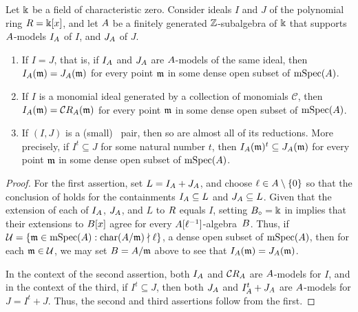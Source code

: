 \documentclass{amsart}
\begin{document}
\begin{corollary}
\label{reduction basics: C}
Let $\Bbbk$ be a field of characteristic zero.  Consider ideals  $I$ and $J$ of the polynomial ring $R = \Bbbk[x]$, and let $A$ be a finitely generated $\mathbb{Z}$-subalgebra of $\Bbbk$ that supports $A$-models $I_A$ of $I$, and $J_A$ of $J$.   

\begin{enumerate}[$(1)$]
\item \label{different models of same ideal}
If $I=J$, that is, if $I_A$ and $J_A$ are $A$-models of the same ideal, then $I_A(\mathfrak{m}) = J_A(\mathfrak{m})$ for every point $\mathfrak{m}$ in some dense open subset of $\operatorname{mSpec}(A)$.
\item \label{reduction preserves being monomial} If $I$ is a monomial ideal generated by a collection of monomials $\mathcal{C}$, then $I_A(\mathfrak{m}) = \mathcal{C} R_A(\mathfrak{m})$ for every point $\mathfrak{m}$ in some dense open subset of $\operatorname{mSpec}(A)$.
\item \label{reduction preserves compatibility} If $(I,J)$ is a \textup(small\textup) \compatible\ pair, then so are almost all of its reductions.  More precisely, if $I^t \subseteq J$ for some natural number $t$, then $I_A(\mathfrak{m})^t \subseteq J_A(\mathfrak{m})$ for every point $\mathfrak{m}$ in some dense open subset of $\operatorname{mSpec}(A)$.
\end{enumerate}
\end{corollary}

\begin{proof}
   For the first assertion, set $L=I_A + J_A$, and choose $\ell \in A \setminus \{0\}$ so that the conclusion of  holds for the containments $I_A \subseteq L$ and $J_A \subseteq L$.
   Given that the extension of each of $I_A$, $J_A$, and $L$ to $R$ equals $I$, setting $B_{\circ} = \Bbbk$ in  implies that their extensions to $B[x]$ agree for every $A[\ell^{-1}]$-algebra~$B$.
   Thus, if $\mathcal{U} = \{ \mathfrak{m} \in \operatorname{mSpec}(A) : \operatorname{char}(A/\mathfrak{m}) \nmid \ell \}$,  a dense open subset of $\operatorname{mSpec}(A)$, 
 then for each $\mathfrak{m} \in \mathcal{U}$, we may set $B=A/\mathfrak{m}$ above to see that $I_A(\mathfrak{m}) = J_A(\mathfrak{m})$.

 In the context of the second assertion, both $I_A$ and $\mathcal{C}R_A$ are $A$-models for $I$, and in the context of the third, if $I^t \subseteq J$, then both $J_A$ and $I_A^t +J_A$ are $A$-models for $J=I^t + J$.
 Thus, the second and third assertions follow from the first. 
\end{proof}
\end{document}
